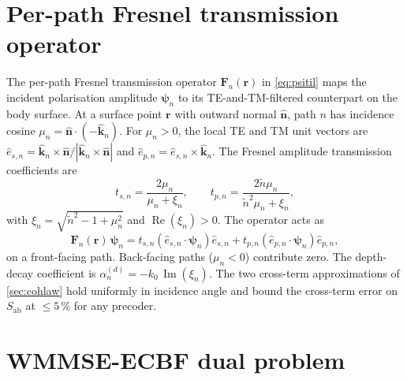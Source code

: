 \documentclass[journal,twocolumn,10pt]{IEEEtran}
\theoremstyle{plain}
\theoremstyle{remark}
\newcommand{\khat}{\hat{\bm{k}}}
\newcommand{\nhat}{\hat{\bm{n}}}
\newcommand{\rr}{\mathbf{r}}
\newcommand{\Sab}{S_{\mathrm{ab}}}
\newcommand{\Fn}{\mathbf{F}_n}
\newcommand{\psin}{\bm{\psi}_n}
\newcommand{\ntilde}{\tilde{n}}
\DeclareMathOperator{\RE}{Re}
\DeclareMathOperator{\IM}{Im}
\begin{document}
\appendices

\section{Per-path Fresnel transmission operator}\label{app:fresnel}

The per-path Fresnel transmission operator $\Fn(\rr)$ in
\cref{eq:psitil} maps the incident polarisation amplitude $\psin$
to its TE-and-TM-filtered counterpart on the body surface. At a
surface point $\rr$ with outward normal $\nhat$, path $n$ has
incidence cosine $\mu_n = \nhat \cdot (-\khat_n)$. For $\mu_n > 0$,
the local TE and TM unit vectors are
$\hat{e}_{s,n} = \khat_n \times \nhat / |\khat_n \times \nhat|$ and
$\hat{e}_{p,n} = \hat{e}_{s,n} \times \khat_n$. The Fresnel
amplitude transmission coefficients are
\begin{equation}\label{eq:t-coef-app}
  t_{s,n} = \frac{2 \mu_n}{\mu_n + \xi_n},
  \qquad
  t_{p,n} = \frac{2 \ntilde \mu_n}{\ntilde^2 \mu_n + \xi_n},
\end{equation}
with $\xi_n = \sqrt{\ntilde^2 - 1 + \mu_n^2}$ and
$\RE(\xi_n) > 0$. The operator acts as
\begin{equation}\label{eq:F-action}
  \Fn(\rr)\,\psin = t_{s,n}(\hat{e}_{s,n} \cdot \psin)
  \hat{e}_{s,n} + t_{p,n}(\hat{e}_{p,n} \cdot \psin) \hat{e}_{p,n},
\end{equation}
on a front-facing path. Back-facing paths ($\mu_n < 0$) contribute
zero. The depth-decay coefficient is
$\alpha_n^{(d)} = -k_0\,\IM(\xi_n)$. The two cross-term
approximations of \cref{sec:cohlaw} hold uniformly in incidence
angle and bound the cross-term error on $\Sab$ at $\leq 5\,\%$ for
any precoder.


\section{WMMSE-ECBF dual problem}\label{app:ecbf}
\end{document}
